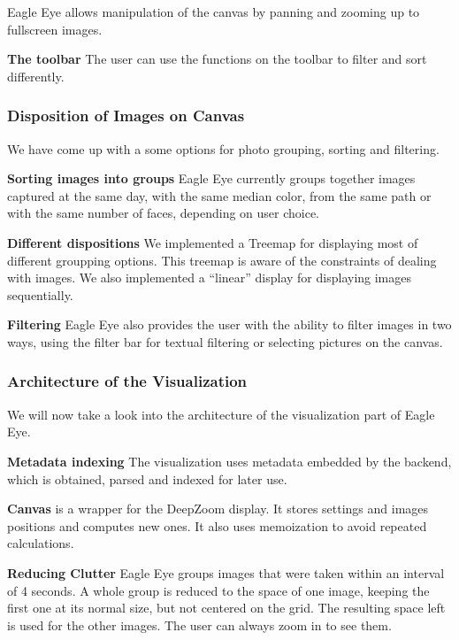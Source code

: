 Eagle Eye allows manipulation of the canvas by panning and zooming up to fullscreen images.


\textbf{The toolbar}
The user can use the functions on the toolbar to filter and sort differently.



\subsubsection{Disposition of Images on Canvas}
\label{sub:dispositions}

We have come up with a some options for photo grouping, sorting and filtering.

\textbf{Sorting images into groups} Eagle Eye currently groups together images captured at the same day, with the same median color, from the same path or with the same number of faces, depending on user choice.

\textbf{Different dispositions} We implemented a Treemap for displaying most of different groupping options. This treemap is aware of the constraints of dealing with images. We also implemented a ``linear'' display for displaying images sequentially.

\textbf{Filtering} %
Eagle Eye also provides the user with the ability to filter images in two ways, using the filter bar for textual filtering or selecting pictures on the canvas.



\subsubsection{Architecture of the Visualization}

We will now take a look into the architecture of the visualization part of Eagle Eye.


\textbf{Metadata indexing} The visualization uses metadata embedded by the backend, which is obtained, parsed and indexed for later use.

\textbf{Canvas} is a wrapper for the DeepZoom display. It stores settings and images positions and computes new ones. It also uses memoization to avoid repeated calculations.

\textbf{Reducing Clutter} Eagle Eye groups images that were taken within an interval of 4 seconds. A whole group is reduced to the space of one image, keeping the first one at its normal size, but not centered on the grid. The resulting space left is used for the other images. The user can always zoom in to see them.